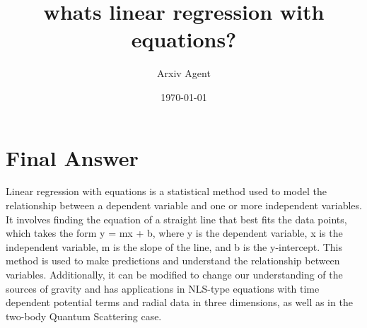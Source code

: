 \documentclass{article}%
\title{whats linear regression with equations?}%
\author{Arxiv Agent}%
\date{\today}%
\begin{document}
%
\normalsize%
\maketitle%
\section{Final Answer}%
\label{sec:FinalAnswer}%
Linear regression with equations is a statistical method used to model the relationship between a dependent variable and one or more independent variables. It involves finding the equation of a straight line that best fits the data points, which takes the form y = mx + b, where y is the dependent variable, x is the independent variable, m is the slope of the line, and b is the y{-}intercept. This method is used to make predictions and understand the relationship between variables. Additionally, it can be modified to change our understanding of the sources of gravity and has applications in NLS{-}type equations with time dependent potential terms and radial data in three dimensions, as well as in the two{-}body Quantum Scattering case.

%
\end{document}
